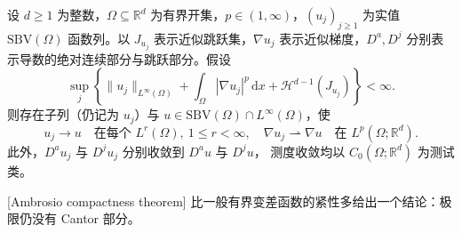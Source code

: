\begin{theorem}
\label{b1:thm:ambrosio-sbv-compactness}
设 \(d\ge1\) 为整数，\(\Omega\subseteq\mathbb R^d\) 为有界开集，\(p\in(1,\infty)\)，\((u_j)_{j\ge1}\) 为实值 \(\mathrm{SBV}(\Omega)\) 函数列。以 \(J_{u_j}\) 表示近似跳跃集，\(\nabla u_j\) 表示近似梯度，\(D^a,D^j\) 分别表示导数的绝对连续部分与跳跃部分。假设
\[
 \sup_j\left\{\|u_j\|_{L^\infty(\Omega)}
       +\int_\Omega|\nabla u_j|^p\,\mathrm dx
       +\mathcal H^{d-1}(J_{u_j})\right\}<\infty.
\]
则存在子列（仍记为 \(u_j\)）与 \(u\in \mathrm{SBV}(\Omega)\cap L^\infty(\Omega)\)，使
\[
 u_j\longrightarrow u\quad\text{在每个 }L^r(\Omega),\ 1\le r<\infty,
 \quad
 \nabla u_j\rightharpoonup\nabla u\quad\text{在 }L^p(\Omega;\mathbb R^d).
\]
此外，\(D^au_j\) 与 \(D^ju_j\) 分别\WeakStar{}收敛到 \(D^au\) 与 \(D^ju\)，
测度收敛均以 \(C_0(\Omega;\mathbb R^d)\) 为测试类。
\end{theorem}
[Ambrosio compactness theorem]
比一般有界变差函数的紧性多给出一个结论：极限仍没有 Cantor 部分。
